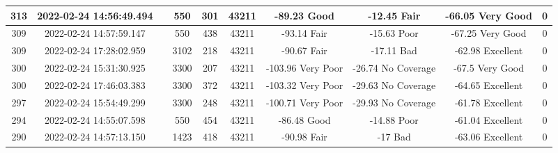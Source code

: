 \begin{longtable*}{|c|c|c|c|c|c|c|c|c|c|}
313&2022-02-24 14:56:49.494&&550&301&43211& -89.23    Good        & -12.45    Fair        & -66.05    Very Good   & 0\\\hline
{}309&2022-02-24 14:57:59.147&&550&438&43211& -93.14    Fair        & -15.63    Poor        & -67.25    Very Good   & 0\\\hline
{}309&2022-02-24 17:28:02.959&&3102&218&43211& -90.67    Fair        & -17.11    Bad         & -62.98    Excellent   & 0\\\hline
{}300&2022-02-24 15:31:30.925&&3300&207&43211& -103.96   Very Poor   & -26.74    No Coverage & -67.5     Very Good   & 0\\\hline
{}300&2022-02-24 17:46:03.383&&3300&372&43211& -103.32   Very Poor   & -29.63    No Coverage & -64.65    Excellent   & 0\\\hline
{}297&2022-02-24 15:54:49.299&&3300&248&43211& -100.71   Very Poor   & -29.93    No Coverage & -61.78    Excellent   & 0\\\hline
{}294&2022-02-24 14:55:07.598&&550&454&43211& -86.48    Good        & -14.88    Poor        & -61.04    Excellent   & 0\\\hline
{}290&2022-02-24 14:57:13.150&&1423&418&43211& -90.98    Fair        & -17       Bad         & -63.06    Excellent   & 0\\\hline

\end{longtable*}
